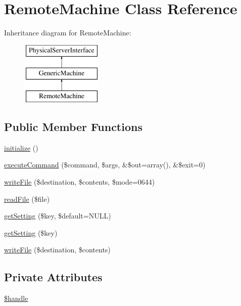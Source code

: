 \hypertarget{classRemoteMachine}{\section{Remote\-Machine Class Reference}
\label{classRemoteMachine}
}
Inheritance diagram for Remote\-Machine\-:\begin{figure}[H]
\begin{center}
\leavevmode
\includegraphics[height=3.000000cm]{classRemoteMachine}
\end{center}
\end{figure}
\subsection*{Public Member Functions}
\begin{DoxyCompactItemize}
\item 
\hyperlink{classRemoteMachine_a6ae2f4b473fd1d2defb20e39f4cfb9e6}{initialize} ()
\item 
\hyperlink{classRemoteMachine_ac9f075d061970e49aece217a33313a40}{execute\-Command} (\$command, \$args, \&\$out=array(), \&\$exit=0)
\item 
\hyperlink{classRemoteMachine_a0f74d3a87ae5fc4c6609ed49aa4bb4f8}{write\-File} (\$destination, \$contents, \$mode=0644)
\item 
\hyperlink{classRemoteMachine_ae2d60a33ab596237bd679aded8681ad2}{read\-File} (\$file)
\item 
\hyperlink{classGenericMachine_ae4e9eb3e4e7809afe0151d3435a927f9}{get\-Setting} (\$key, \$default=N\-U\-L\-L)
\item 
\hyperlink{interfacePhysicalServerInterface_a86167983d096e7dd41f7a4007774d0cb}{get\-Setting} (\$key)
\item 
\hyperlink{interfacePhysicalServerInterface_ad4488de39c860dc5b8d868c89d90a58f}{write\-File} (\$destination, \$contents)
\end{DoxyCompactItemize}
\subsection*{Private Attributes}
\begin{DoxyCompactItemize}
\item 
\hyperlink{classRemoteMachine_ae130e0a68f147af07e27034af6e94f42}{\$handle}
\end{DoxyCompactItemize}


